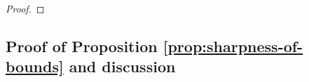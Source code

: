 \begin{proof}





\end{proof}

\subsection{Proof of Proposition \ref{prop:sharpness-of-bounds} and discussion} \label{sec:sharpness-of-bounds-supplement}



